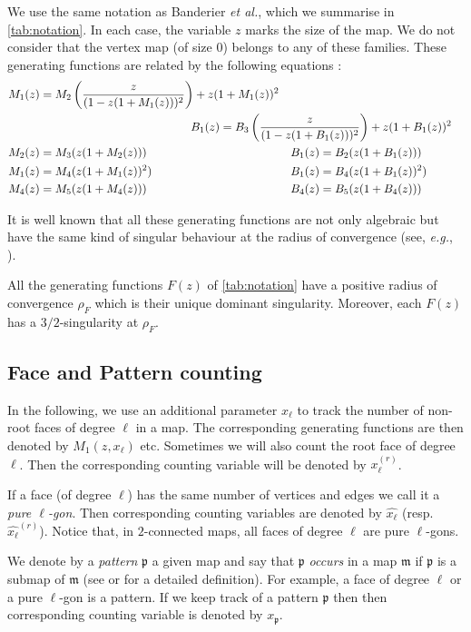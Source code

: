 \documentclass[a4paper,UKenglish,cleveref, autoref, thm-restate]{lipics-v2021}
\renewcommand{\(}{\left(}
\renewcommand{\)}{\right)}
\newcommand{\ellgon}{pure \texorpdfstring{$\ell$}{ell}-gon}
\newcommand{\ellgons}{\ellgon s}
\newcommand{\p}{\mathfrak{p}}
\newcommand{\m}{\mathfrak{m}}
\newcommand{\withroot}{^{(r)}}
\newcommand{\xface}{x_{\ell}}
\newcommand{\xfacer}{\xface\withroot}
\newcommand{\xellgon}{\widehat{\xface}}
\newcommand{\xellgonr}{\xellgon\withroot}
\begin{document}
We use the same notation as Banderier \emph{et al.}, which we summarise in \cref{tab:notation}. In each case, the variable $z$ marks the size of the map. We do not consider that the vertex map (of size $0$) belongs to any of these families. These generating functions are related by the following equations \cite{airy}:
\begin{alignat}{2}
&M_1(z) = M_2\(\frac{z}{(1-z(1+M_1(z)))^2}\) + z(1+M_1(z))^2 \label{eq:M1-M2}\\
& && \hspace{-0.25\textwidth} B_1(z) = B_3\(\frac{z}{(1-z(1+B_1(z)))^2}\) + z(1+B_1(z))^2 \\
&M_2(z) = M_3(z(1+M_2(z))) && B_1(z) = B_2(z(1+B_1(z)))\\
&M_1(z) = M_4(z(1+M_1(z))^2) && B_1(z) = B_4(z(1+B_1(z))^2) \label{eq:M1-M4}\\
&M_4(z) = M_5(z(1+M_4(z))) && B_4(z) = B_5(z(1+B_4(z)))
\end{alignat}

It is well known that all these generating functions are not only algebraic
but have the same kind of singular behaviour at the radius of convergence 
(see, \emph{e.g.}, \cite{airy}).
\begin{lemma}
All the generating functions $F(z)$ of \cref{tab:notation} have a positive radius of convergence $\rho_F$ which is their unique dominant singularity. Moreover, each $F(z)$ has a $3/2$-singularity at $\rho_F$.
\end{lemma}

\subsection{Face and Pattern counting}

In the following, we use an additional parameter $x_\ell$ to track the 
number of non-root faces of degree $\ell$ in a map.
The corresponding generating functions are then denoted 
by $M_1(z,x_\ell)$ etc. Sometimes we will also count the root face of degree $\ell$.
Then the corresponding counting variable will be denoted by $\xfacer$.

If a face (of degree $\ell$) has the same number of vertices and edges we call it a \emph{\ellgon}.
Then corresponding counting variables are denoted by $\xellgon$ (resp. $\xellgonr$). Notice that, in $2$-connected maps, all faces of degree $\ell$ are \ellgons.

We denote by a \emph{pattern} $\p$ a given map and say that $\p$ \emph{occurs} in a map $\m$ if
$\p$ is a submap of $\m$ (see \cite{Yu19} or \cite{DHW25} for a detailed definition).
For example, a face of degree $\ell$ or a \ellgon{} is a pattern.
If we keep track of a pattern $\p$ then then corresponding counting variable is denoted by $x_\p$.
\end{document}
